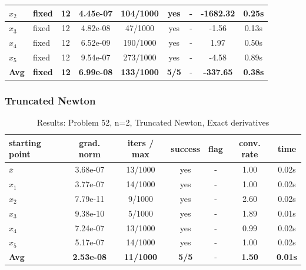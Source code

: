 \begin{longtable}{|l|l|c|c|c|c|c|c|c|}
\hline
$x_2$ & fixed & 12 & 4.45e-07 & 104/1000 & yes & - & -1682.32 & 0.25s \\
\hline
$x_3$ & fixed & 12 & 4.82e-08 & 47/1000 & yes & - & -1.56 & 0.13s \\
\hline
$x_4$ & fixed & 12 & 6.52e-09 & 190/1000 & yes & - & 1.97 & 0.50s \\
\hline
$x_5$ & fixed & 12 & 9.54e-07 & 273/1000 & yes & - & -4.58 & 0.89s \\
\hline
\hline\hline
\textbf{Avg} & \textbf{fixed} & \textbf{12} & \textbf{6.99e-08} & \textbf{133/1000} & \textbf{5/5} & - & \textbf{-337.65} & \textbf{0.38s} \\
\hline\hline
\end{longtable}


\subsubsection{Truncated Newton}

\begin{longtable}{|l|c|c|c|c|c|c|}
\caption{Results: Problem 52, n=2, Truncated Newton, Exact derivatives} \\
\hline
\textbf{starting point} & \textbf{grad. norm} & \textbf{iters / max} & \textbf{success} & \textbf{flag} & \textbf{conv. rate} & \textbf{time} \\
\hline
\endfirsthead
\endhead
\endfoot
\hline
\endlastfoot
$\bar{x}$ & 3.68e-07 & 13/1000 & yes & - & 1.00 & 0.02s \\
\hline
$x_1$ & 3.77e-07 & 14/1000 & yes & - & 1.00 & 0.02s \\
\hline
$x_2$ & 7.79e-11 & 9/1000 & yes & - & 2.60 & 0.02s \\
\hline
$x_3$ & 9.38e-10 & 5/1000 & yes & - & 1.89 & 0.01s \\
\hline
$x_4$ & 7.24e-07 & 13/1000 & yes & - & 0.99 & 0.02s \\
\hline
$x_5$ & 5.17e-07 & 14/1000 & yes & - & 1.00 & 0.02s \\
\hline
\hline\hline
\textbf{Avg} & \textbf{2.53e-08} & \textbf{11/1000} & \textbf{5/5} & - & \textbf{1.50} & \textbf{0.01s} \\
\hline\hline
\end{longtable}


